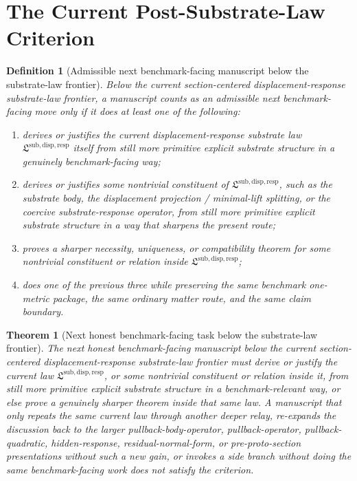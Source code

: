 \documentclass[11pt]{article}
\newcommand{\SubstrateLaw}{\mathfrak L^{\mathrm{sub,disp,resp}}}
\newtheorem{definition}{Definition}
\newtheorem{theorem}{Theorem}
\begin{document}
\section{The Current Post-Substrate-Law Criterion}

\begin{definition}[Admissible next benchmark-facing manuscript below the substrate-law frontier]
Below the current section-centered displacement-response substrate-law frontier, a manuscript counts as an admissible next benchmark-facing move only if it does at least one of the following:
\begin{enumerate}
    \item derives or justifies the current displacement-response substrate law \(\SubstrateLaw\) itself from still more primitive explicit substrate structure in a genuinely benchmark-facing way;
    \item derives or justifies some nontrivial constituent of \(\SubstrateLaw\), such as the substrate body, the displacement projection / minimal-lift splitting, or the coercive substrate-response operator, from still more primitive explicit substrate structure in a way that sharpens the present route;
    \item proves a sharper necessity, uniqueness, or compatibility theorem for some nontrivial constituent or relation inside \(\SubstrateLaw\);
    \item does one of the previous three while preserving the same benchmark one-metric package, the same ordinary matter route, and the same claim boundary.
\end{enumerate}
\end{definition}

\begin{theorem}[Next honest benchmark-facing task below the substrate-law frontier]
The next honest benchmark-facing manuscript below the current section-centered displacement-response substrate-law frontier must derive or justify the current law \(\SubstrateLaw\), or some nontrivial constituent or relation inside it, from still more primitive explicit substrate structure in a benchmark-relevant way, or else prove a genuinely sharper theorem inside that same law. A manuscript that only repeats the same current law through another deeper relay, re-expands the discussion back to the larger pullback-body-operator, pullback-operator, pullback-quadratic, hidden-response, residual-normal-form, or pre-proto-section presentations without such a new gain, or invokes a side branch without doing the same benchmark-facing work does not satisfy the criterion.
\end{theorem}
\end{document}
